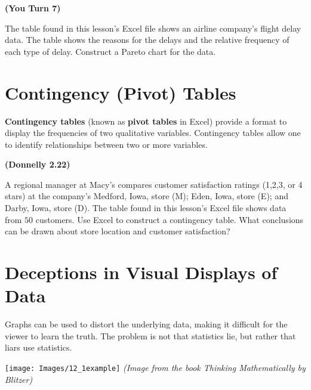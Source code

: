\documentclass[12pt, letterpaper]{article}
\newcounter{exercise}
\theoremstyle{definition}
\begin{document}
\begin{exercise} \textbf{(You Turn 7)}

The table found in this lesson's Excel file shows an airline company's flight delay data.  The table shows the reasons for the delays and the relative frequency of each type of delay.  Construct a Pareto chart for the data.

\end{exercise}

\vfill

\section*{Contingency (Pivot) Tables}

\begin{defn}
\textbf{Contingency tables} (known as \textbf{pivot tables} in Excel) provide a format to display the frequencies of two qualitative variables.  Contingency tables allow one to identify relationships between two or more variables.
\end{defn}

\begin{exercise} \textbf{(Donnelly 2.22)}

A regional manager at Macy's compares customer satisfaction ratings (1,2,3, or 4 stars) at the company's Medford, Iowa, store (M); Eden, Iowa, store (E); and Darby, Iowa, store (D).  The table found in this lesson's Excel file shows data from $50$ customers.  Use Excel to construct a contingency table.  What conclusions can be drawn about store location and customer satisfaction?

\end{exercise}

\vfill

\newpage

\section*{Deceptions in Visual Displays of Data}

Graphs can be used to distort the underlying data, making it difficult for the viewer to learn the truth.  The problem is not that statistics lie, but rather that liars use statistics.

\begin{center}
\texttt{[image: Images/12\_1example]}
\textit{(Image from the book \textit{Thinking Mathematically} by Blitzer)}
\end{center}
\end{document}

